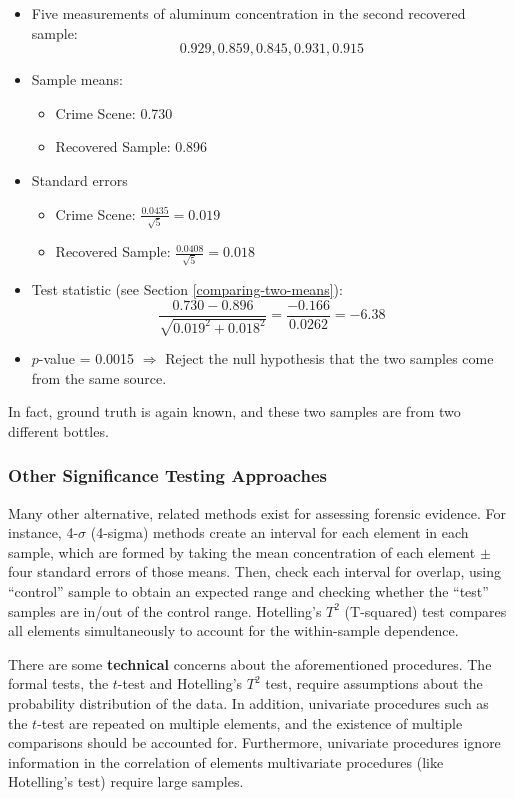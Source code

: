 \documentclass[]{book}
\providecommand{\tightlist}{%
  \setlength{\itemsep}{0pt}\setlength{\parskip}{0pt}}
\theoremstyle{definition}
\theoremstyle{definition}
\theoremstyle{remark}
\begin{document}
\begin{itemize}
\tightlist
\item
  Five measurements of aluminum concentration in the second recovered
  sample: \[0.929, 0.859, 0.845, 0.931, 0.915\]
\item
  Sample means:

  \begin{itemize}
  \tightlist
  \item
    Crime Scene: 0.730
  \item
    Recovered Sample: 0.896
  \end{itemize}
\item
  Standard errors

  \begin{itemize}
  \tightlist
  \item
    Crime Scene: \(\frac{0.0435}{\sqrt{5}}=0.019\)
  \item
    Recovered Sample: \(\frac{0.0408}{\sqrt{5}}=0.018\)
  \end{itemize}
\item
  Test statistic (see Section \ref{comparing-two-means}):
  \[\frac{0.730 - 0.896}{\sqrt{0.019^2 + 0.018^2}} = \frac{-0.166}{0.0262} = -6.38 \]
\item
  \(p\)-value = 0.0015 \(\Rightarrow\) Reject the null hypothesis that
  the two samples come from the same source.
\end{itemize}

In fact, ground truth is again known, and these two samples are from two
different bottles.

\subsubsection{Other Significance Testing
Approaches}\label{other-significance-testing-approaches}

Many other alternative, related methods exist for assessing forensic
evidence. For instance, 4-\(\sigma\) (4-sigma) methods create an
interval for each element in each sample, which are formed by taking the
mean concentration of each element \(\pm\) four standard errors of those
means. Then, check each interval for overlap, using ``control'' sample
to obtain an expected range and checking whether the ``test'' samples
are in/out of the control range. Hotelling's \(T^2\) (T-squared) test
compares all elements simultaneously to account for the within-sample
dependence.

There are some \textbf{technical} concerns about the aforementioned
procedures. The formal tests, the \(t\)-test and Hotelling's \(T^2\)
test, require assumptions about the probability distribution of the
data. In addition, univariate procedures such as the \(t\)-test are
repeated on multiple elements, and the existence of multiple comparisons
should be accounted for. Furthermore, univariate procedures ignore
information in the correlation of elements multivariate procedures (like
Hotelling's test) require large samples.
\end{document}
